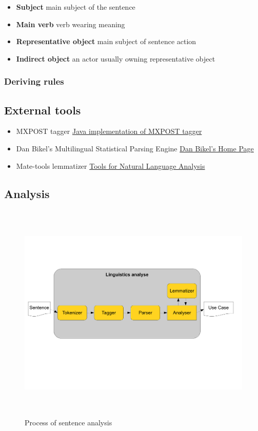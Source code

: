 \begin{itemize}
\item {\bf Subject} main subject of the sentence
\item {\bf Main verb} verb wearing meaning
\item {\bf Representative object} main subject of sentence action
\item {\bf Indirect object} an actor usually owning representative object
\end{itemize}

\subsubsection{Deriving rules}

\subsection{External tools}
\label{sec:externaltools}

\begin{itemize}
\item MXPOST tagger \href{http://www.inf.ed.ac.uk/resources/nlp/local_doc/MXPOST.html}{Java implementation of MXPOST tagger}
\item Dan Bikel's Multilingual Statistical Parsing Engine \href{http://www.cis.upenn.edu/~dbikel/software.html#stat-parser}{Dan Bikel’s Home Page}
\item Mate-tools lemmatizer \href{http://code.google.com/p/mate-tools/}{Tools for Natural Language Analysis}
\end{itemize}

\subsection{Analysis}
\label{sec:analysis}

\begin{figure}[h]
  \centering
  \includegraphics[height=300pt]{images/LinguisticsAnalyse}
  \caption{Process of sentence analysis}
  \label{fig:LinguisticsAnalyse}
\end{figure}

